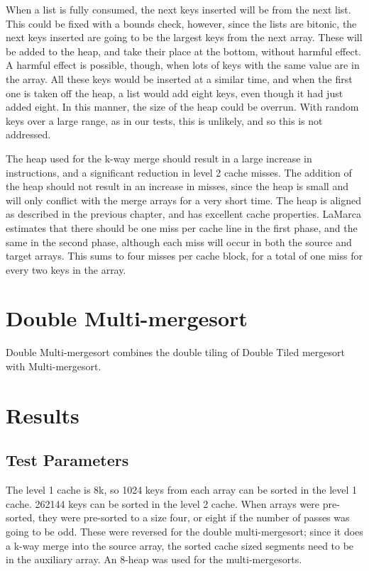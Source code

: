 When a list is fully consumed, the next keys inserted will be from the next
list. This could be fixed with a bounds check, however, since the lists are
bitonic, the next keys inserted are going to be the largest keys from the next
array. These will be added to the heap, and take their place at the bottom,
without harmful effect. A harmful effect is possible, though, when lots of keys 
with the same value are in the array. All these keys would be inserted at a
similar time, and when the first one is taken off the heap, a list would add
eight keys, even though it had just added eight. In this manner, the size of the
heap could be overrun. With random keys over a large range, as in our tests,
this is unlikely, and so this is not addressed.

The heap used for the k-way merge should result in a large increase in
instructions, and a significant reduction in level 2 cache misses. The addition
of the heap should not result in an increase in misses, since the heap is small
and will only conflict with the merge arrays for a very short time. The heap is
aligned as described in the previous chapter, and has excellent cache
properties. LaMarca estimates that there should be one miss per cache line
in the first phase, and the same in the second phase, although each miss will
occur in both the source and target arrays. This sums to four misses per cache
block, for a total of one miss for every two keys in the array.

\section{Double Multi-mergesort}

Double Multi-mergesort combines the double tiling of Double Tiled mergesort with
Multi-mergesort.

\section{Results}
\subsection{Test Parameters}
The level 1 cache is 8k, so 1024 keys from each array can be sorted in the level
1 cache. 262144 keys can be sorted in the level 2 cache. When arrays were
pre-sorted, they were pre-sorted to a size four, or eight if the number of
passes was going to be odd. These were reversed for the double multi-mergesort;
since it does a k-way merge into the source array, the sorted cache sized
segments need to be in the auxiliary array. An 8-heap was used for the
multi-mergesorts.

